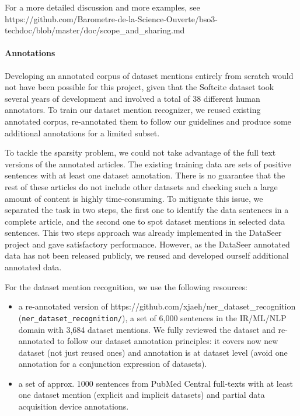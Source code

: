 \documentclass[
]{article}
\begin{document}
For a more detailed discussion and more examples, see
https://github.com/Barometre-de-la-Science-Ouverte/bso3-techdoc/blob/master/doc/scope\_and\_sharing.md

\hypertarget{annotations-1}{%
\paragraph{Annotations}\label{annotations-1}}

Developing an annotated corpus of dataset mentions entirely from scratch
would not have been possible for this project, given that the Softcite
dataset took several years of development and involved a total of 38
different human annotators. To train our dataset mention recognizer, we
reused existing annotated corpus, re-annotated them to follow our
guidelines and produce some additional annotations for a limited subset.

To tackle the sparsity problem, we could not take advantage of the full
text versions of the annotated articles. The existing training data are
sets of positive sentences with at least one dataset annotation. There
is no guarantee that the rest of these articles do not include other
datasets and checking such a large amount of content is highly
time-consuming. To mitiguate this issue, we separated the task in two
steps, the first one to identify the data sentences in a complete
article, and the second one to spot dataset mentions in selected data
sentences. This two steps approach was already implemented in the
DataSeer project and gave satisfactory performance. However, as the
DataSeer annotated data has not been released publicly, we reused and
developed ourself additional annotated data.

For the dataset mention recognition, we use the following resources:

\begin{itemize}
\item
  a re-annotated version of
  https://github.com/xjaeh/ner\_dataset\_recognition
  (\texttt{ner\_dataset\_recognition/}), a set of 6,000 sentences in the
  IR/ML/NLP domain with 3,684 dataset mentions. We fully reviewed the
  dataset and re-annotated to follow our dataset annotation principles:
  it covers now new dataset (not just reused ones) and annotation is at
  dataset level (avoid one annotation for a conjunction expression of
  datasets).
\item
  a set of approx. 1000 sentences from PubMed Central full-texts with at
  least one dataset mention (explicit and implicit datasets) and partial
  data acquisition device annotations.
\end{itemize}
\end{document}
